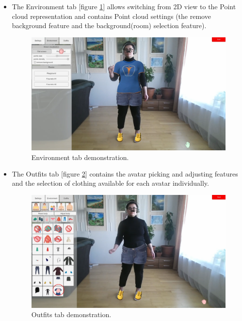 \documentclass[a4paper]{report}
\begin{document}
\begin{itemize}
    
    \item The Environment tab [figure \ref{fig:ui_2}] allows switching from 2D view to the Point cloud representation and contains Point cloud settings (the remove background feature and the background(room) selection feature).
    \begin{figure}[H]
    \centering
    \includegraphics[width=\textwidth, keepaspectratio]{images/UI/UI_2.png}
    \caption{Environment tab demonstration.}
    \label{fig:ui_2}
    \end{figure}
    
    
    \item The Outfits tab [figure \ref{fig:ui_3}] contains the avatar picking and adjusting features and the selection of clothing available for each avatar individually. 
 
    \begin{figure}[H]
    \centering
    \includegraphics[width=\textwidth, keepaspectratio]{images/UI/UI_3.png}
    \caption{Outfits tab demonstration.}
    \label{fig:ui_3}
    \end{figure}

\end{itemize}
\end{document}
